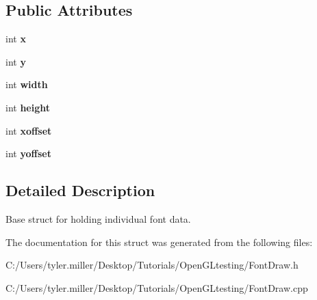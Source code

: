 \subsection*{Public Attributes}
\begin{DoxyCompactItemize}
\item 
\hypertarget{struct_char_vec_a21533fa2af7f03cd326c99a985bd7124}{}int {\bfseries x}\label{struct_char_vec_a21533fa2af7f03cd326c99a985bd7124}

\item 
\hypertarget{struct_char_vec_a5ceb4e88841cc9e0e2c0f0c8cd3db7e0}{}int {\bfseries y}\label{struct_char_vec_a5ceb4e88841cc9e0e2c0f0c8cd3db7e0}

\item 
\hypertarget{struct_char_vec_a4dc630b2dab414daff000d62a2fb4c0f}{}int {\bfseries width}\label{struct_char_vec_a4dc630b2dab414daff000d62a2fb4c0f}

\item 
\hypertarget{struct_char_vec_a124808c93e2dee334a6e1ac416604505}{}int {\bfseries height}\label{struct_char_vec_a124808c93e2dee334a6e1ac416604505}

\item 
\hypertarget{struct_char_vec_a12471f751f01795cb5814ec199884b7d}{}int {\bfseries xoffset}\label{struct_char_vec_a12471f751f01795cb5814ec199884b7d}

\item 
\hypertarget{struct_char_vec_ad1e042dc21b488854aab30f066a0c1c2}{}int {\bfseries yoffset}\label{struct_char_vec_ad1e042dc21b488854aab30f066a0c1c2}

\end{DoxyCompactItemize}


\subsection{Detailed Description}
Base struct for holding individual font data. 

The documentation for this struct was generated from the following files\+:\begin{DoxyCompactItemize}
\item 
C\+:/\+Users/tyler.\+miller/\+Desktop/\+Tutorials/\+Open\+G\+Ltesting/Font\+Draw.\+h\item 
C\+:/\+Users/tyler.\+miller/\+Desktop/\+Tutorials/\+Open\+G\+Ltesting/Font\+Draw.\+cpp\end{DoxyCompactItemize}
